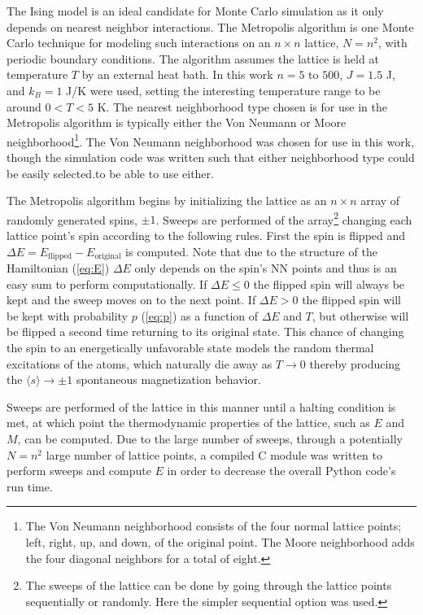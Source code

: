 \documentclass[notitlepage,aps,prd,nofootinbib]{revtex4-1}
\begin{document}
The Ising model is an ideal candidate for Monte Carlo simulation as it only depends on nearest neighbor interactions. The Metropolis algorithm is one Monte Carlo technique for modeling such interactions on an $n\times n$ lattice, $N=n^{2}$, with periodic boundary conditions. The algorithm assumes the lattice is held at temperature $T$ by an external heat bath. In this work $n=5$ to $500$, $J=1.5$ J, and $k_{B}=1$ J/K were used, setting the interesting temperature range to be around $0 < T < 5$ K. The nearest neighborhood type chosen is for use in the Metropolis algorithm is typically either the Von Neumann or Moore neighborhood\footnote{The Von Neumann neighborhood consists of the four normal lattice points; left, right, up, and down, of the original point. The Moore neighborhood adds the four diagonal neighbors for a total of eight.}. The Von Neumann neighborhood was chosen for use in this work, though the simulation code was written such that either neighborhood type could be easily selected.to be able to use either.

The Metropolis algorithm begins by initializing the lattice as an $n\times n$ array of randomly generated spins, $\pm 1$. Sweeps are performed of the array\footnote{The sweeps of the lattice can be done by going through the lattice points sequentially or randomly. Here the simpler sequential option was used.} changing each lattice point's spin according to the following rules. First the spin is flipped and $\Delta E = E_{\mathrm{flipped}} - E_{\mathrm{original}}$ is computed. Note that due to the structure of the Hamiltonian (\ref{eq:E}) $\Delta E$ only depends on the spin's NN points and thus is an easy sum to perform computationally. If $\Delta E \leq 0$ the flipped spin will always be kept and the sweep moves on to the next point. If $\Delta E > 0$ the flipped spin will be kept with probability $p$ (\ref{eq:p}) as a function of $\Delta E$ and $T$, but otherwise will be flipped a second time returning to its original state. This chance of changing the spin to an energetically unfavorable state models the random thermal excitations of the atoms, which naturally die away as $T\rightarrow0$ thereby producing the $\langle s \rangle \rightarrow \pm 1$ spontaneous magnetization behavior.

Sweeps are performed of the lattice in this manner until a halting condition is met, at which point the thermodynamic properties of the lattice, such as $E$ and $M$, can be computed. Due to the large number of sweeps, through a potentially $N=n^2$ large number of lattice points, a compiled C module was written to perform sweeps and compute $E$ in order to decrease the overall Python code's run time.
\end{document}
